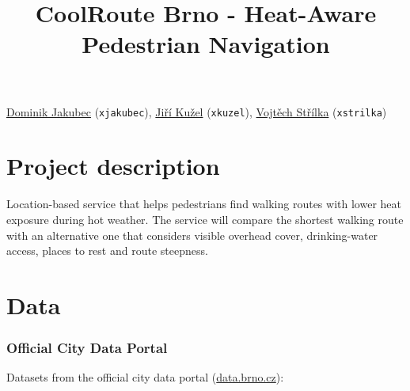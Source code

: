 \documentclass[11pt,a4paper]{article}
\title{CoolRoute Brno - Heat-Aware Pedestrian Navigation}
\author{}
\date{}
\makeatletter
\renewcommand{\maketitle}{%
  \begin{center}
    {\LARGE \@title\par}
  \end{center}
}
\makeatother
\begin{document}
\maketitle

\begin{center}
  \href{https://is.mendelu.cz/auth/lide/clovek.pl?id=100907;}{Dominik Jakubec} (\texttt{xjakubec}), \href{https://is.mendelu.cz/auth/lide/clovek.pl?id=100910;}{Jiří Kužel} (\texttt{xkuzel}), \href{https://is.mendelu.cz/auth/lide/clovek.pl?id=100912;}{Vojtěch Střílka} (\texttt{xstrilka})
\end{center}

\section{Project description}\label{project-description}

Location-based service that helps pedestrians find walking routes with lower heat exposure during hot weather. The service will compare the shortest walking route with an alternative one that considers visible overhead cover, drinking-water access, places to rest and route steepness.

\section{Data}\label{data}

\subsubsection{Official City Data Portal}

Datasets from the official city data portal (\href{https://data.brno.cz/}{data.brno.cz}):
\end{document}
